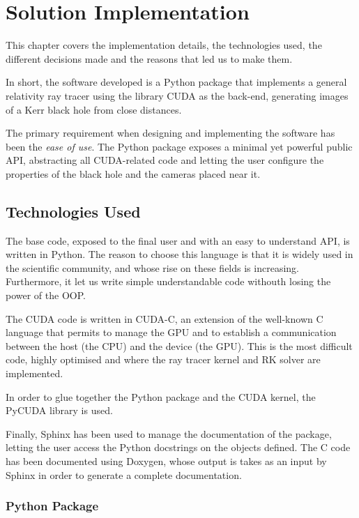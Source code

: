 \chapter{Solution Implementation}
\label{chapter:implementation}

This chapter covers the implementation details, the technologies used, the different decisions made and the reasons that led us to make them.

In short, the software developed is a Python package that implements a general relativity ray tracer using the library \ac{CUDA} as the back-end, generating images of a Kerr black hole from close distances.

The primary requirement when designing and implementing the software has been the \emph{ease of use}. The Python package exposes a minimal yet powerful public \ac{API}, abstracting all \ac{CUDA}-related code and letting the user configure the properties of the black hole and the cameras placed near it.

\section{Technologies Used}

The base code, exposed to the final user and with an easy to understand \ac{API}, is written in Python. The reason to choose this language is that it is widely used in the scientific community, and whose rise on these fields is increasing. Furthermore, it let us write simple understandable code withouth losing the power of the \ac{OOP}.

The \ac{CUDA} code is written in \ac{CUDA}-C, an extension of the well-known C language that permits to manage the \ac{GPU} and to establish a communication between the host (the \ac{CPU}) and the device (the \ac{GPU}). This is the most difficult code, highly optimised and where the ray tracer kernel and \ac{RK} solver are implemented.

In order to glue together the Python package and the \ac{CUDA} kernel, the PyCUDA library is used.

Finally, Sphinx has been used to manage the documentation of the package, letting the user access the Python docstrings on the objects defined. The C code has been documented using Doxygen, whose output is takes as an input by Sphinx in order to generate a complete documentation.

\subsection{Python Package}

